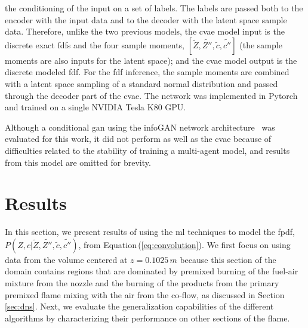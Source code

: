 \documentclass[review]{elsarticle}
\newcommand{\wt}[1]{\widetilde{#1}}
\begin{document}
the conditioning of the input on a set of labels. The labels are
passed both to the encoder with the input data and to the decoder with
the latent space sample data. Therefore, unlike the two previous
models, the \gls{cvae} model input is the discrete exact \glspl{fdf}
and the four sample moments,
$\left[ \wt{Z}, \wt{Z''}, \wt{c}, \wt{c''} \right]$ (the sample
moments are also inputs for the latent space); and the \gls{cvae}
model output is the discrete modeled \gls{fdf}. For the \gls{fdf}
inference, the sample moments are combined with a latent space
sampling of a standard normal distribution and passed through the
decoder part of the \gls{cvae}. The network was implemented in
Pytorch~\cite{Paszke2017} and trained on a single NVIDIA Tesla K80
GPU.

Although a conditional \gls{gan} using the infoGAN network
architecture~\cite{Chen2016a} was evaluated for this work, it did not
perform as well as the \gls{cvae} because of difficulties related to the
stability of training a multi-agent model, and results from this model
are omitted for brevity.

\section{Results}\label{sec:results}

In this section, we present results of using the \gls{ml} techniques
to model the \gls{fpdf},
$P(Z,c | \wt{Z}, \wt{Z''}, \wt{c}, \wt{c''})$, from
Equation\,(\ref{eq:convolution}). We first focus on using data from
the volume centered at $z=0.1025\,\unit{m}$ because this section of
the domain contains regions that are dominated by premixed burning of
the fuel-air mixture from the nozzle and the burning of the products
from the primary premixed flame mixing with the air from the co-flow,
as discussed in Section\,\ref{sec:dns}. Next, we evaluate the
generalization capabilities of the different algorithms by
characterizing their performance on other sections of the flame.
\end{document}
